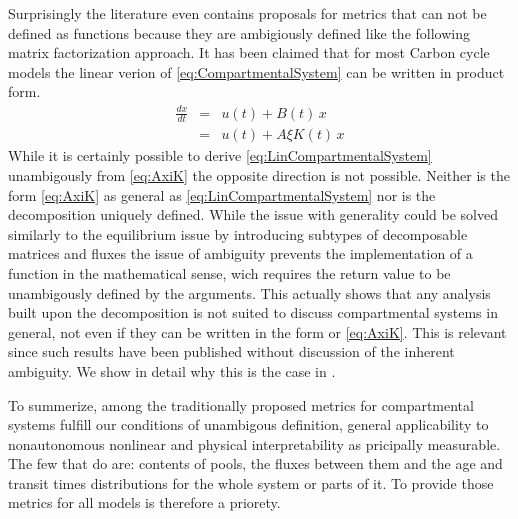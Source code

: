 Surprisingly the literature even contains proposals for metrics that can not be defined as functions because they are ambigiously defined like the following matrix factorization approach.  It has been claimed that for most Carbon cycle models the linear verion of \eqref{eq:CompartmentalSystem} can be written in product form.
\begin{eqnarray} 
  \frac{dx}{dt} &=& u(t) + B(t) \, x 
  \label{eq:LinCompartmentalSystem} 
  \\
                &=& u(t) + A \xi K(t) \, x
  \label{eq:AxiK}
\end{eqnarray}
While it is certainly possible to derive \eqref{eq:LinCompartmentalSystem} unambigously from \eqref{eq:AxiK} the opposite direction is not possible. Neither is the form \eqref{eq:AxiK} as general as \eqref{eq:LinCompartmentalSystem} nor is the decomposition uniquely defined.
While the issue with generality could be solved similarly to the equilibrium
issue by introducing subtypes of decomposable matrices and fluxes the issue of
ambiguity prevents the implementation of a function in the mathematical sense, wich requires the return value to be unambigously defined by the arguments.
This actually shows that any analysis built upon the decomposition is not
suited to discuss compartmental systems in general, not even if they can be
written in the form or \eqref{eq:AxiK}. This is relevant since such results have been published without discussion of the inherent ambiguity. We show in detail why this is the case in .

To summerize, among the traditionally proposed 
metrics for compartmental systems fulfill our conditions of unambigous definition, general applicability to nonautonomous nonlinear and physical interpretability as pricipally measurable. The few that do are:
contents of pools, the fluxes between them and the age and transit times distributions for the whole system or parts of it.  
To provide those metrics for all models is therefore a priorety.

